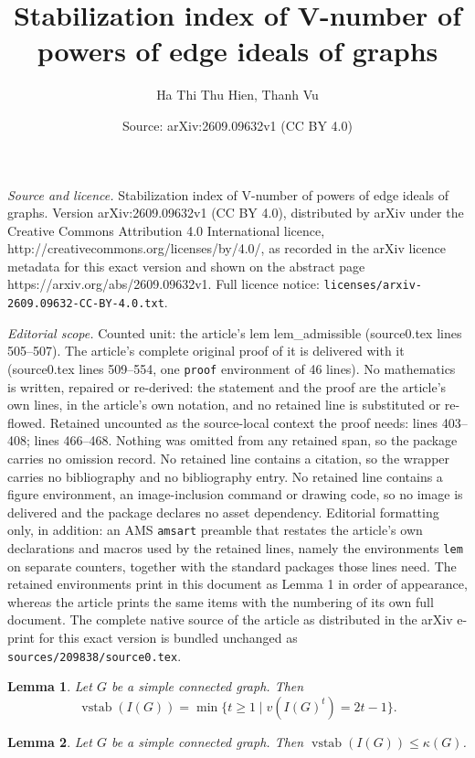 \documentclass[10pt,a4paper]{amsart}
\title{Stabilization index of V-number of powers of edge ideals of graphs}
\author{Ha Thi Thu Hien, Thanh Vu}
\date{Source: arXiv:2609.09632v1 (CC BY 4.0)}
\newtheorem{lem}{Lemma}
\begin{document}
\maketitle

\noindent\emph{Source and licence.} Stabilization index of V-number of powers of edge ideals of graphs. Version arXiv:2609.09632v1 (CC BY 4.0), distributed by arXiv under the Creative Commons Attribution 4.0 International licence, http://creativecommons.org/licenses/by/4.0/, as recorded in the arXiv licence metadata for this exact version and shown on the abstract page https://arxiv.org/abs/2609.09632v1. Full licence notice: \texttt{licenses/arxiv-2609.09632-CC-BY-4.0.txt}.\par\smallskip

\noindent\textit{Editorial scope.} Counted unit: the article's lem lem\_admissible (source0.tex lines 505--507). The article's complete original proof of it is delivered with it (source0.tex lines 509--554, one \texttt{proof} environment of 46 lines). No mathematics is written, repaired or re-derived: the statement and the proof are the article's own lines, in the article's own notation, and no retained line is substituted or re-flowed.  Retained uncounted as the source-local context the proof needs: lines 403--408; lines 466--468.  Nothing was omitted from any retained span, so the package carries no omission record.  No retained line contains a citation, so the wrapper carries no bibliography and no bibliography entry.  No retained line contains a figure environment, an image-inclusion command or drawing code, so no image is delivered and the package declares no asset dependency.  Editorial formatting only, in addition: an AMS \texttt{amsart} preamble that restates the article's own declarations and macros used by the retained lines, namely the environments \texttt{lem} on separate counters, together with the standard packages those lines need.  The retained environments print in this document as Lemma 1 in order of appearance, whereas the article prints the same items with the numbering of its own full document.  The complete native source of the article as distributed in the arXiv e-print for this exact version is bundled unchanged as \texttt{sources/209838/source0.tex}.
\begin{lem}\label{lem_index_0} 
Let $G$ be a simple connected graph. Then 
\[
\operatorname{vstab}(I(G)) = \min \{t \ge 1 \mid v(I(G)^t) = 2t-1\}.
\]
\end{lem}

\begin{lem}\label{lem_kappa_2} 
Let $G$ be a simple connected graph. Then $\operatorname{vstab}(I(G)) \le \kappa(G)$.
\end{lem}
\end{document}
